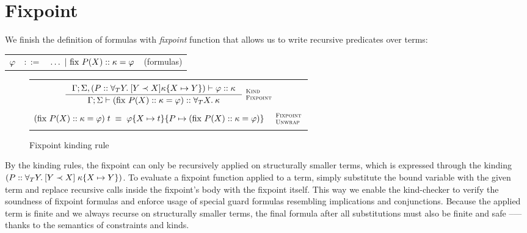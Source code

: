 \documentclass[english, mgr]{iithesis}
\renewcommand{\it}[1]{\textit{#1}}
\newcommand{\fix}[3]{\ensuremath{\text{fix }#1(#2)\ofkind#3=}}\newcommand{\myatop}[2]{\ensuremath{\genfrac{}{}{0pt}{}{#1\hfill}{#2\hfill}}}
\newcommand{\scbrk}[2]{\myatop{\textsc{#1}}{\textsc{#2}}}
\begin{document}
\section{Fixpoint}
We finish the definition of formulas with \it{fixpoint} function
that allows us to write recursive predicates over terms:
\\
\begin{tabular}{rrlr}
$\varphi$ & $::=$ & $\ldots
               \bnfor \fix{\propv}{\termv}{\kind}{\formphi} $
    & (formulas)
\end{tabular}

\begin{figure}[htpb]
  \begin{tabularx}{\textwidth}{|C|}
    \hline \\ $
\inference{
  \cEnv;\kEnv, (\propv \ofkind \kForallTerm{Y} \kGuard{Y \cshlt \termv}{\kind\subst{\termv}{Y}})\vdash \formphi \ofkind \kind
}{
  \cEnv;\kEnv\vdash (\fix{\propv}{\termv}{\kind}{\formphi}) \ofkind \kForallTerm{\termv}{\kind}
}\:\scbrk{Kind}{Fixpoint}
  $ \\ \\
  $
(\fix{\propv}{\termv}{\kind}{\formphi})\fApp\term
\;\equiv\;
\formphi\subst{\termv}{\term}\subst{\propv}{(\fix{\propv}{\termv}{\kind}{\formphi})}
\quad\:\scbrk{Fixpoint}{Unwrap}$
  \\ \\ \hline
\end{tabularx}
  \caption{Fixpoint kinding rule}
  \label{fig:fixpoint-kinding}
\end{figure}
By the kinding rules, the fixpoint can only be recursively applied on structurally smaller terms,
which is expressed through the kinding $(P :: \forall_T Y .\: [Y \prec X]{\;\kappa\{X\mapsto Y\}})$.
To evaluate a fixpoint function applied to a term, simply substitute the bound
variable with the given term and replace recursive calls inside the fixpoint's body with the fixpoint itself.
This way we enable the kind-checker to verify the soundness of fixpoint formulas
and enforce usage of special guard formulas resembling implications and conjunctions.
Because the applied term is finite
and we always recurse on structurally smaller terms,
the final formula after all substitutions must also be finite and safe
--— thanks to the semantics of constraints and kinds.
\end{document}
